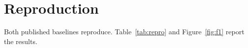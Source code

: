 \documentclass[preprint,12pt,authoryear]{elsarticle}
\providecommand{\DIFaddbegin}{} %
\providecommand{\DIFaddend}{} %
\providecommand{\DIFdelbegin}{} %
\providecommand{\DIFdelend}{} %
\newcommand{\DIFscaledelfig}{0.5}
\newlength{\DIFdelgraphicswidth} %
\newlength{\DIFdelgraphicsheight} %
\newcommand{\DIFaddincludegraphics}[2][]{{\color{blue}\fbox{\DIFOincludegraphics[#1]{#2}}}} %
\newcommand{\DIFdelincludegraphics}[2][]{%
\sbox{\DIFdelgraphicsbox}{\DIFOincludegraphics[#1]{#2}}%
\settoboxwidth{\DIFdelgraphicswidth}{\DIFdelgraphicsbox} %
\settoboxtotalheight{\DIFdelgraphicsheight}{\DIFdelgraphicsbox} %
\scalebox{\DIFscaledelfig}{%
\parbox[b]{\DIFdelgraphicswidth}{\usebox{\DIFdelgraphicsbox}\\[-\baselineskip] \rule{\DIFdelgraphicswidth}{0em}}\llap{\resizebox{\DIFdelgraphicswidth}{\DIFdelgraphicsheight}{%
\setlength{\unitlength}{\DIFdelgraphicswidth}%
\begin{picture}(1,1)%
\thicklines\linethickness{2pt} %
{\color[rgb]{1,0,0}\put(0,0){\framebox(1,1){}}}%
{\color[rgb]{1,0,0}\put(0,0){\line( 1,1){1}}}%
{\color[rgb]{1,0,0}\put(0,1){\line(1,-1){1}}}%
\end{picture}%
}\hspace*{3pt}}} %
} %
\DeclareRobustCommand{\DIFaddbegin}{\DIFOaddbegin \let\includegraphics\DIFaddincludegraphics} %
\DeclareRobustCommand{\DIFaddend}{\DIFOaddend \let\includegraphics\DIFOincludegraphics} %
\DeclareRobustCommand{\DIFdelbegin}{\DIFOdelbegin \let\includegraphics\DIFdelincludegraphics} %
\DeclareRobustCommand{\DIFdelend}{\DIFOaddend \let\includegraphics\DIFOincludegraphics} %
\begin{document}
\section{Reproduction}
\label{sec:repro}

Both published baselines reproduce. Table~\ref{tab:repro} and
Figure~\ref{fig:f1} report the results.

\DIFdelbegin %
\DIFdelend \DIFaddbegin \begin{table}[h]
\centering
\caption{Reproduction of published baselines on StudentLife. Mean and
standard deviation of micro-F1 across 50 folds (10 repetitions of
5-fold cross-validation), except the authors' released checkpoint,
which contains 5 folds. All configurations were retrained for this
revision; every result in Section~\ref{sec:results} derives from these
runs.}
\label{tab:repro}
\end{table}
\DIFaddend 
\end{document}
